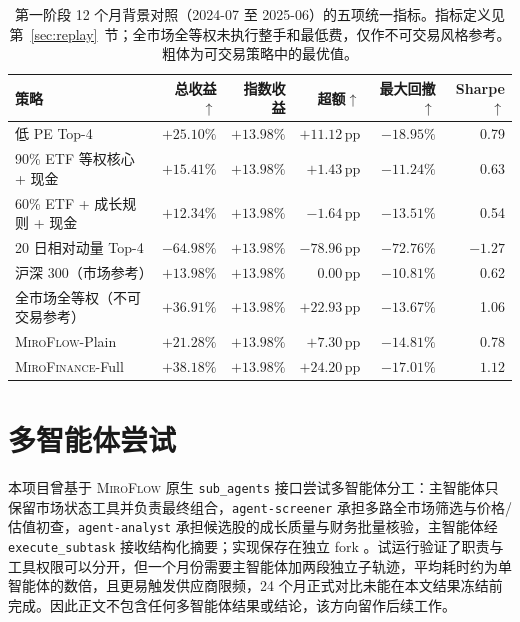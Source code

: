 \documentclass[11pt]{article}
\newcommand{\miroflow}{\textsc{MiroFlow}}
\newcommand{\memskill}{\textsc{MiroFinance}}
\newcommand{\pp}{\,\mathrm{pp}}
\begin{document}
\begin{table}[t]
\centering
\caption{第一阶段 12 个月背景对照（2024-07 至 2025-06）的五项统一指标。指标定义见第~\ref{sec:replay}~节；全市场全等权未执行整手和最低费，仅作不可交易风格参考。粗体为可交易策略中的最优值。}
\label{tab:phase1}
\small
\begin{tabular}{@{}lrrrrr@{}}
\toprule
\textbf{策略} & \textbf{总收益}$\uparrow$ & \textbf{指数收益} &
\textbf{超额}$\uparrow$ & \textbf{最大回撤}$\uparrow$ & \textbf{Sharpe}$\uparrow$ \\
\midrule
低 PE Top-4 & $+25.10\%$ & $+13.98\%$ & $+11.12\pp$ & $-18.95\%$ & 0.79 \\
90\% ETF 等权核心 + 现金 & $+15.41\%$ & $+13.98\%$ & $+1.43\pp$ & $\mathbf{-11.24\%}$ & 0.63 \\
60\% ETF + 成长规则 + 现金 & $+12.34\%$ & $+13.98\%$ & $-1.64\pp$ & $-13.51\%$ & 0.54 \\
20 日相对动量 Top-4 & $-64.98\%$ & $+13.98\%$ & $-78.96\pp$ & $-72.76\%$ & $-1.27$ \\
\midrule
沪深 300（市场参考） & $+13.98\%$ & $+13.98\%$ & $0.00\pp$ & $-10.81\%$ & 0.62 \\
全市场全等权（不可交易参考） & $+36.91\%$ & $+13.98\%$ & $+22.93\pp$ & $-13.67\%$ & 1.06 \\
\midrule
\miroflow{}-Plain & $+21.28\%$ & $+13.98\%$ & $+7.30\pp$ & $-14.81\%$ & 0.78 \\
\memskill{}-Full & $\mathbf{+38.18\%}$ & $+13.98\%$ & $\mathbf{+24.20\pp}$ & $-17.01\%$ & $\mathbf{1.12}$ \\
\bottomrule
\end{tabular}
\end{table}

\section{多智能体尝试}
\label{sec:appendix-multiagent}

本项目曾基于 \miroflow{} 原生 \texttt{sub\_agents} 接口尝试多智能体分工：主智能体只保留市场状态工具并负责最终组合，\texttt{agent-screener} 承担多路全市场筛选与价格/估值初查，\texttt{agent-analyst} 承担候选股的成长质量与财务批量核验，主智能体经 \texttt{execute\_subtask} 接收结构化摘要；实现保存在独立 fork 。试运行验证了职责与工具权限可以分开，但一个月份需要主智能体加两段独立子轨迹，平均耗时约为单智能体的数倍，且更易触发供应商限频，24 个月正式对比未能在本文结果冻结前完成。因此正文不包含任何多智能体结果或结论，该方向留作后续工作。
\end{document}
